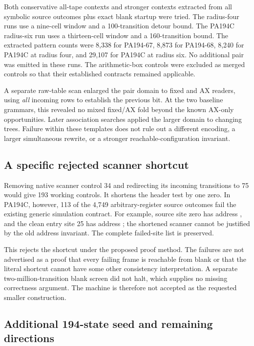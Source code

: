 Both conservative all-tape contexts and stronger contexts extracted from
all symbolic source outcomes plus exact blank startup were tried. The
radius-four runs use a nine-cell window and a 100-transition detour bound.
The PA194C radius-six run uses a thirteen-cell window and a 160-transition
bound. The extracted pattern counts were 8,338 for PA194-67, 8,873 for
PA194-68, 8,240 for PA194C at radius four, and 29,107 for PA194C at radius
six. No additional pair was emitted in these runs. The arithmetic-box
controls were excluded as merged controls so that their established
contracts remained applicable.

A separate raw-table scan enlarged the pair domain to fixed and AX readers,
using \emph{all} incoming rows to establish the previous bit. At the two
baseline grammars, this revealed no mixed fixed/AX fold beyond the known
AX-only opportunities. Later association searches applied the larger
domain to changing trees. Failure within these templates does not rule out
a different encoding, a larger simultaneous rewrite, or a stronger
reachable-configuration invariant.

\subsection{A specific rejected scanner shortcut}

Removing native scanner control 34 and redirecting its incoming transitions
to 75 would give 193 working controls. It shortens the header test by one
zero. In PA194C, however, 113 of the 4,749 arbitrary-register source
outcomes fail the existing generic simulation contract. For example,
source site zero has address , and the clean entry site 25
has address ; the shortened scanner cannot be justified by
the old address invariant. The complete failed-site list is preserved.

This rejects the shortcut under the proposed proof method. The failures
are not advertised as a proof that every failing frame is reachable from
blank or that the literal shortcut cannot have some other consistency
interpretation. A separate two-million-transition blank screen did not
halt, which supplies no missing correctness argument. The machine is
therefore not accepted as the requested smaller construction.

\subsection{Additional 194-state seed and remaining directions}

